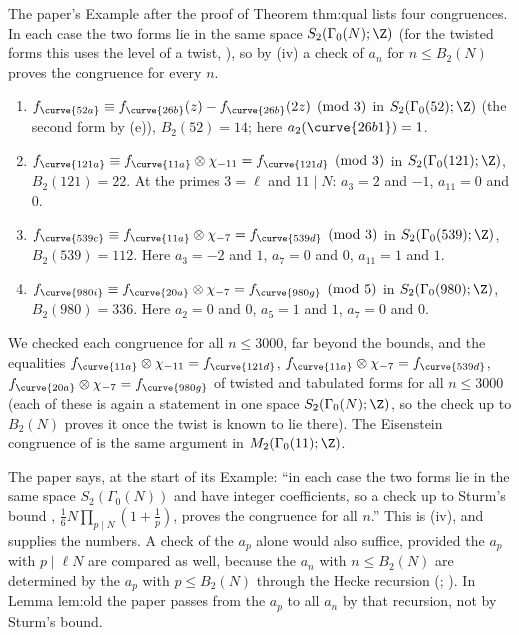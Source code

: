 \begin{example}\label{ex:modforms:paper-congruences}
The paper's Example after the proof of Theorem thm:qual lists four congruences. In each case the two forms lie in the same space $S_2(\Gamma_0(N);\Z)$ (for the twisted forms this
uses the level of a twist, ), so by (iv) a check of $a_n$ for $n\le B_2(N)$ proves the congruence for every $n$.
\begin{enumerate}[label=(\alph*)]
\item $f_{\curve{52a}}\equiv f_{\curve{26b}}(z)-f_{\curve{26b}}(2z)\pmod3$ in $S_2(\Gamma_0(52);\Z)$ (the second form by (e)), $B_2(52)=14$; here $a_2(\curve{26b1})=1$.
\item $f_{\curve{121a}}\equiv f_{\curve{11a}}\otimes\chi_{-11}=f_{\curve{121d}}\pmod3$ in $S_2(\Gamma_0(121);\Z)$, $B_2(121)=22$. At the primes $3=\ell$ and $11\mid N$:
$a_3=2$ and $-1$, $a_{11}=0$ and $0$.
\item $f_{\curve{539c}}\equiv f_{\curve{11a}}\otimes\chi_{-7}=f_{\curve{539d}}\pmod3$ in $S_2(\Gamma_0(539);\Z)$, $B_2(539)=112$. Here $a_3=-2$ and $1$, $a_7=0$ and $0$, $a_{11}=1$ and $1$.
\item $f_{\curve{980i}}\equiv f_{\curve{20a}}\otimes\chi_{-7}=f_{\curve{980g}}\pmod5$ in $S_2(\Gamma_0(980);\Z)$, $B_2(980)=336$. Here $a_2=0$ and $0$, $a_5=1$ and $1$, $a_7=0$ and $0$.
\end{enumerate}
We checked each congruence for all $n\le3000$, far beyond the bounds, and the equalities $f_{\curve{11a}}\otimes\chi_{-11}=f_{\curve{121d}}$, $f_{\curve{11a}}\otimes\chi_{-7}=f_{\curve{539d}}$,
$f_{\curve{20a}}\otimes\chi_{-7}=f_{\curve{980g}}$ of twisted and tabulated forms for all $n\le3000$ (each of these is again a statement in one space $S_2(\Gamma_0(N);\Z)$, so the check up to
$B_2(N)$ proves it once the twist is known to lie there). The Eisenstein congruence of  is the same argument in $M_2(\Gamma_0(11);\Z)$.
\end{example}

\begin{paperlink}\label{pl:modforms:example}
The paper says, at the start of its Example: ``in each case the two forms lie in the same space $S_2(\Gamma_0(N))$ and have integer coefficients, so a check up to Sturm's bound
\cite{Sturm87}, $\frac16N\prod_{p\mid N}(1+\frac1p)$, proves the congruence for all $n$.'' This is (iv), and 
supplies the numbers. A check of the $a_p$ alone would also suffice, provided the $a_p$ with $p\mid\ell N$ are compared as well, because the $a_n$ with $n\le B_2(N)$ are determined by the $a_p$ with $p\le B_2(N)$ through the Hecke recursion
(; ). In Lemma lem:old the paper passes from the $a_p$ to all $a_n$ by that recursion, not by Sturm's bound.
\end{paperlink}

